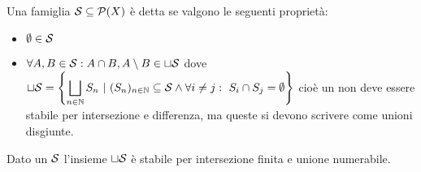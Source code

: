 \begin{definition}[\Semiring{}]
	Una famiglia $\S\subseteq \mathcal P(X)$ è detta \semiring{} se valgono le seguenti proprietà:
	\begin{itemize}
		\item $\emptyset\in \S$
		\item $\displaystyle\forall A,B\in \S: A\cap B, A\setminus B\in \sqcup \S$ dove
		$\displaystyle
		\sqcup{ \S }=\left\{\bigsqcup_{n\in \N} S_n\ |\ (S_n)_{n\in\N} \subseteq \S \wedge \forall i\not= j:\ S_i\cap S_j=\emptyset\right\}$ 
		cioè un \semiring{} non deve essere stabile per intersezione e differenza, ma queste si devono scrivere come unioni disgiunte.
	\end{itemize}
\end{definition}

\begin{proposition}\label{prop:UnioneDisgiuntaQuasiAlgebra}
	Dato un \semiring{} $\S$ l'insieme $\sqcup\S$ è stabile per intersezione finita e unione numerabile.
\end{proposition}
